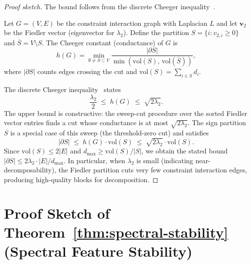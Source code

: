 \documentclass[11pt]{article}
\begin{document}
\begin{proof}[Proof sketch]
The bound follows from the discrete Cheeger inequality~\cite{cheeger1970,alon1985}.

Let $G = (V, E)$ be the constraint interaction graph with Laplacian $L$ and let $\mathbf{v}_2$ be the Fiedler vector (eigenvector for $\lambda_2$).  Define the partition $S = \{i : v_{2,i} \geq 0\}$ and $\bar{S} = V \setminus S$.  The Cheeger constant (conductance) of $G$ is
\[
  h(G) = \min_{\emptyset \neq S \subset V}
         \frac{|\partial S|}{\min(\mathrm{vol}(S),\, \mathrm{vol}(\bar S))},
\]
where $|\partial S|$ counts edges crossing the cut and $\mathrm{vol}(S) = \sum_{i \in S} d_i$.

The discrete Cheeger inequality~\cite{alon1985,chung1997} states
\[
  \frac{\lambda_2}{2} \;\leq\; h(G) \;\leq\; \sqrt{2\lambda_2}.
\]
The upper bound is constructive: the sweep-cut procedure over the sorted Fiedler vector entries finds a cut whose conductance is at most $\sqrt{2\lambda_2}$.  The sign partition $S$ is a special case of this sweep (the threshold-zero cut) and satisfies
\[
  |\partial S| \;\leq\; h(G) \cdot \mathrm{vol}(S) \;\leq\; \sqrt{2\lambda_2} \cdot \mathrm{vol}(S).
\]
Since $\mathrm{vol}(S) \leq 2|E|$ and $d_{\max} \geq \mathrm{vol}(S)/|S|$, we obtain the stated bound $|\partial S| \leq 2\lambda_2 \cdot |E| / d_{\max}$.  In particular, when $\lambda_2$ is small (indicating near-decomposability), the Fiedler partition cuts very few constraint interaction edges, producing high-quality blocks for decomposition.
\end{proof}

\section{Proof Sketch of Theorem~\ref{thm:spectral-stability} (Spectral Feature Stability)}
\label{app:stability-proof}
\end{document}
